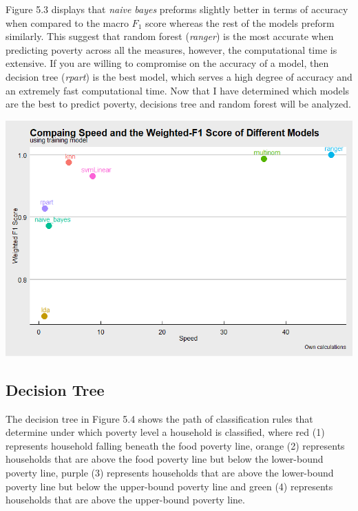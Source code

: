 \documentclass[11pt,preprint, authoryear]{elsarticle}
\let\origfigure\figure
\let\endorigfigure\endfigure
\renewenvironment{figure}[1][2] {
    \expandafter\origfigure\expandafter[H]
} {
    \endorigfigure
}
\numberwithin{equation}{section}
\numberwithin{figure}{section}
\numberwithin{table}{section}
\begin{document}
Figure 5.3 displays that \emph{naive bayes} preforms slightly better in
terms of accuracy when compared to the macro \(F_1\) score whereas the
rest of the models preform similarly. This suggest that random forest
(\emph{ranger}) is the most accurate when predicting poverty across all
the measures, however, the computational time is extensive. If you are
willing to compromise on the accuracy of a model, then decision tree
(\emph{rpart}) is the best model, which serves a high degree of accuracy
and an extremely fast computational time. Now that I have determined
which models are the best to predict poverty, decisions tree and random
forest will be analyzed.

\begin{figure}
\centerline{\includegraphics[scale=0.65]{weightedF1.png}}
\caption{Speed versus Weighted F1 }
\end{figure}

\hypertarget{decision-tree-1}{%
\subsection{Decision Tree}\label{decision-tree-1}}

The decision tree in Figure 5.4 shows the path of classification rules
that determine under which poverty level a household is classified,
where red (1) represents household falling beneath the food poverty
line, orange (2) represents households that are above the food poverty
line but below the lower-bound poverty line, purple (3) represents
households that are above the lower-bound poverty line but below the
upper-bound poverty line and green (4) represents households that are
above the upper-bound poverty line.
\end{document}
